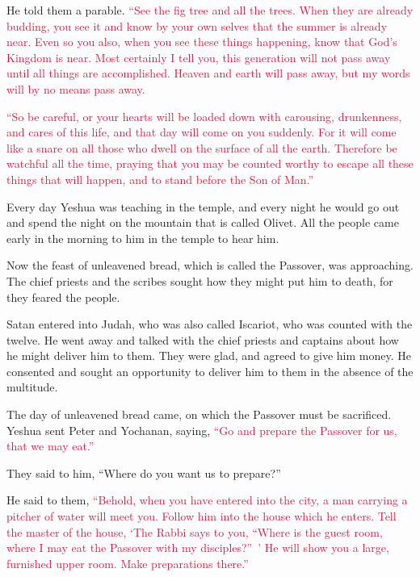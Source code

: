 \myverse{}He told them a parable.
\textcolor{crimson}{“See the fig tree and all the trees.
}
\myverse{}\textcolor{crimson}{When they are already budding, you see it and know by your own selves
	that the summer is already near.
}
\myverse{}\textcolor{crimson}{Even so you also, when you see these things happening, know that God’s
	Kingdom is near.
}
\myverse{}\textcolor{crimson}{Most certainly I tell you, this generation will not pass away until all
	things are accomplished.
}
\myverse{}\textcolor{crimson}{Heaven and earth will pass away, but my words will by no means pass away.}

\myverse{}\textcolor{crimson}{“So be careful, or your hearts will be loaded down with
	carousing, drunkenness, and cares of this life, and that day will come on you suddenly.
}
\myverse{}\textcolor{crimson}{For it will come like a snare on all those who dwell on the surface of
	all the earth.
}
\myverse{}\textcolor{crimson}{Therefore be watchful all the time, praying that you may be counted worthy
	to escape all these things that will happen, and to stand before the Son of Man.”}

\myverse{}Every day Yeshua was teaching in the temple, and every night
he would go out and spend the night on the mountain that is called Olivet.
\myverse{}All the people came early in the morning to him in the temple to hear him.


\mychapter{} \myverse*{}Now the feast of unleavened bread, which is called the Passover,
was approaching.
\myverse{}The chief priests and the scribes sought how they might put him to death, for
they feared the people.

\myverse{}Satan entered into Judah, who was also called Iscariot, who was
counted with the twelve.
\myverse{}He went away and talked with the chief priests and captains about how he might
deliver him to them.
\myverse{}They were glad, and agreed to give him money.
\myverse{}He consented and sought an opportunity to deliver him to them in the absence
of the multitude.

\myverse{}The day of unleavened bread came, on which the Passover must be
sacrificed.
\myverse{}Yeshua sent Peter and Yochanan, saying,
\textcolor{crimson}{“Go and prepare the Passover for us, that we may eat.”}

\myverse{}They said to him, “Where do you want us to prepare?”

\myverse{}He said to them,
\textcolor{crimson}{“Behold, when you have entered into the city, a man carrying a pitcher of water will meet you. Follow
	him into the house which he enters.
}
\myverse{}\textcolor{crimson}{Tell the master of the house, ‘The Rabbi says to you, “Where is the guest
	room, where I may eat the Passover with my disciples?” ’
}
\myverse{}\textcolor{crimson}{He will show you a large, furnished upper room. Make preparations there.”}

